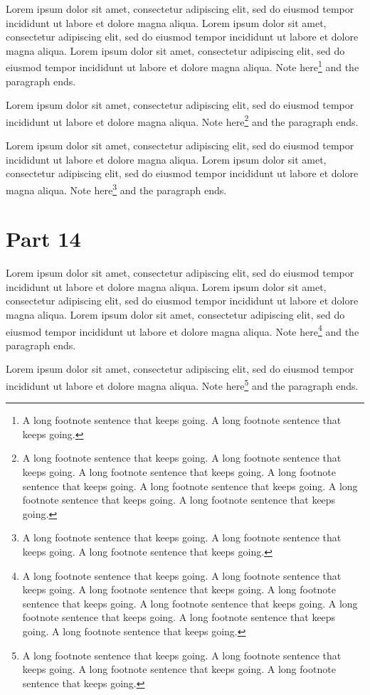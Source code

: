\documentclass{article}
\begin{document}
Lorem ipsum dolor sit amet, consectetur adipiscing elit, sed do eiusmod tempor incididunt ut labore et dolore magna aliqua. Lorem ipsum dolor sit amet, consectetur adipiscing elit, sed do eiusmod tempor incididunt ut labore et dolore magna aliqua. Lorem ipsum dolor sit amet, consectetur adipiscing elit, sed do eiusmod tempor incididunt ut labore et dolore magna aliqua. Note here\footnote{A long footnote sentence that keeps going. A long footnote sentence that keeps going. } and the paragraph ends.

Lorem ipsum dolor sit amet, consectetur adipiscing elit, sed do eiusmod tempor incididunt ut labore et dolore magna aliqua. Note here\footnote{A long footnote sentence that keeps going. A long footnote sentence that keeps going. A long footnote sentence that keeps going. A long footnote sentence that keeps going. A long footnote sentence that keeps going. A long footnote sentence that keeps going. A long footnote sentence that keeps going. } and the paragraph ends.

Lorem ipsum dolor sit amet, consectetur adipiscing elit, sed do eiusmod tempor incididunt ut labore et dolore magna aliqua. Lorem ipsum dolor sit amet, consectetur adipiscing elit, sed do eiusmod tempor incididunt ut labore et dolore magna aliqua. Note here\footnote{A long footnote sentence that keeps going. A long footnote sentence that keeps going. A long footnote sentence that keeps going. } and the paragraph ends.

\section{Part 14}
Lorem ipsum dolor sit amet, consectetur adipiscing elit, sed do eiusmod tempor incididunt ut labore et dolore magna aliqua. Lorem ipsum dolor sit amet, consectetur adipiscing elit, sed do eiusmod tempor incididunt ut labore et dolore magna aliqua. Lorem ipsum dolor sit amet, consectetur adipiscing elit, sed do eiusmod tempor incididunt ut labore et dolore magna aliqua. Note here\footnote{A long footnote sentence that keeps going. A long footnote sentence that keeps going. A long footnote sentence that keeps going. A long footnote sentence that keeps going. A long footnote sentence that keeps going. A long footnote sentence that keeps going. A long footnote sentence that keeps going. A long footnote sentence that keeps going. } and the paragraph ends.

Lorem ipsum dolor sit amet, consectetur adipiscing elit, sed do eiusmod tempor incididunt ut labore et dolore magna aliqua. Note here\footnote{A long footnote sentence that keeps going. A long footnote sentence that keeps going. A long footnote sentence that keeps going. A long footnote sentence that keeps going. } and the paragraph ends.
\end{document}
